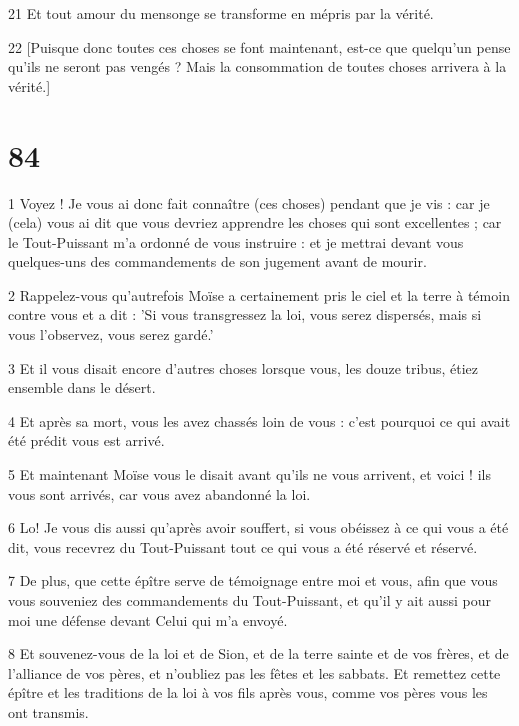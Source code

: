 \par 21 Et tout amour du mensonge se transforme en mépris par la vérité.

\par 22 [Puisque donc toutes ces choses se font maintenant, est-ce que quelqu'un pense qu'ils ne seront pas vengés ? Mais la consommation de toutes choses arrivera à la vérité.]

\chapter{84}

\par 1 Voyez ! Je vous ai donc fait connaître (ces choses) pendant que je vis : car je (cela) vous ai dit que vous devriez apprendre les choses qui sont excellentes ; car le Tout-Puissant m'a ordonné de vous instruire : et je mettrai devant vous quelques-uns des commandements de son jugement avant de mourir.

\par 2 Rappelez-vous qu'autrefois Moïse a certainement pris le ciel et la terre à témoin contre vous et a dit : 'Si vous transgressez la loi, vous serez dispersés, mais si vous l'observez, vous serez gardé.'

\par 3 Et il vous disait encore d'autres choses lorsque vous, les douze tribus, étiez ensemble dans le désert.

\par 4 Et après sa mort, vous les avez chassés loin de vous : c'est pourquoi ce qui avait été prédit vous est arrivé.

\par 5 Et maintenant Moïse vous le disait avant qu'ils ne vous arrivent, et voici ! ils vous sont arrivés, car vous avez abandonné la loi.

\par 6 Lo! Je vous dis aussi qu'après avoir souffert, si vous obéissez à ce qui vous a été dit, vous recevrez du Tout-Puissant tout ce qui vous a été réservé et réservé.

\par 7 De plus, que cette épître serve de témoignage entre moi et vous, afin que vous vous souveniez des commandements du Tout-Puissant, et qu'il y ait aussi pour moi une défense devant Celui qui m'a envoyé.

\par 8 Et souvenez-vous de la loi et de Sion, et de la terre sainte et de vos frères, et de l'alliance de vos pères, et n'oubliez pas les fêtes et les sabbats. Et remettez cette épître et les traditions de la loi à vos fils après vous, comme vos pères vous les ont transmis.

